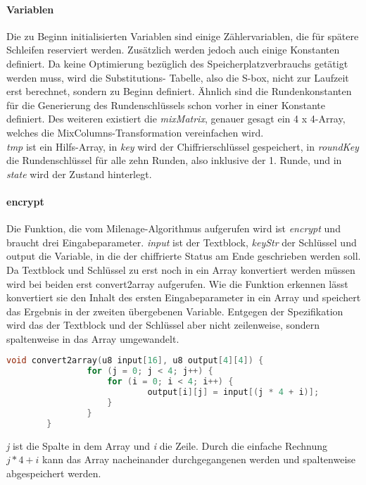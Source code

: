 		\paragraph{Variablen}
		Die zu Beginn initialisierten Variablen sind einige Zählervariablen, die für spätere Schleifen
		reserviert werden. Zusätzlich werden jedoch auch einige Konstanten definiert. Da keine
		Optimierung bezüglich des Speicherplatzverbrauchs getätigt werden muss, wird die Substitutions-
		Tabelle, also die S-box, nicht zur Laufzeit erst berechnet, sondern zu Beginn definiert. Ähnlich
		sind die Rundenkonstanten für die Generierung des Rundenschlüssels schon vorher in einer Konstante
		definiert. Des weiteren existiert die \emph{mixMatrix}, genauer gesagt ein 4 x 4-Array, welches die
		MixColumns-Transformation vereinfachen wird. \\
		\emph{tmp} ist ein Hilfs-Array, in \emph{key} wird der Chiffrierschlüssel gespeichert, in \emph{roundKey}
		die Rundenschlüssel für alle zehn Runden, also inklusive der 1. Runde, und in \emph{state} wird der Zustand
		hinterlegt. 
 
		\paragraph{encrypt}
		Die Funktion, die vom Milenage-Algorithmus aufgerufen wird ist \emph{encrypt} und
		braucht drei Eingabeparameter. \emph{input} ist der Textblock, \emph{keyStr} der
		Schlüssel und output die Variable, in die der chiffrierte Status am Ende geschrieben
		werden soll. \\
		Da Textblock und Schlüssel zu erst noch in ein Array konvertiert werden müssen
		wird bei beiden erst convert2array aufgerufen. Wie die Funktion erkennen lässt
		konvertiert sie den Inhalt des ersten Eingabeparameter in ein Array und speichert das
		Ergebnis in der zweiten übergebenen Variable. Entgegen der Spezifikation wird das
		der Textblock und der Schlüssel aber nicht zeilenweise, sondern spaltenweise in das
		Array umgewandelt.

		\begin{lstlisting}[language=C]
		void convert2array(u8 input[16], u8 output[4][4]) {
    			for (j = 0; j < 4; j++) {
        			for (i = 0; i < 4; i++) {
            				output[i][j] = input[(j * 4 + i)];
        			}
    			}
		} 
        	\end{lstlisting}

		\emph{j} ist die Spalte in dem Array und \emph{i} die Zeile. Durch die einfache
		Rechnung $j*4+i$ kann das Array nacheinander durchgegangenen werden und spaltenweise
		abgespeichert werden. 

